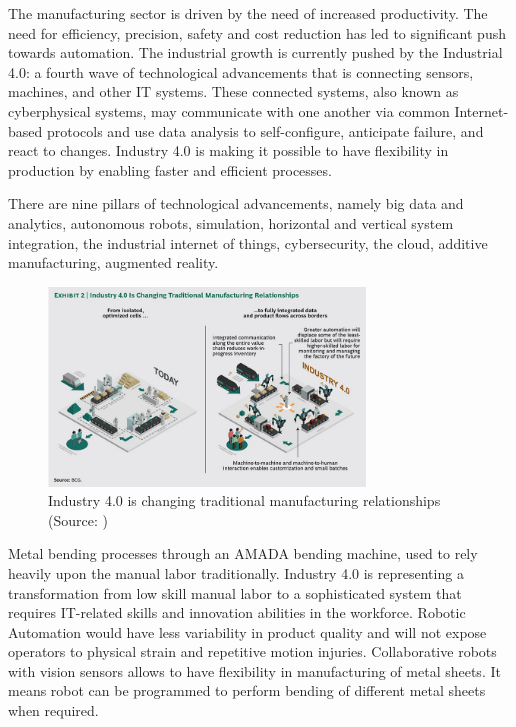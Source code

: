 The manufacturing sector is driven by the need of increased productivity. The need
for efficiency, precision, safety and cost reduction has led to significant push towards
automation. The industrial growth is currently pushed by the Industrial 4.0: a fourth wave
of technological advancements that is connecting sensors, machines, and other
IT systems. These connected systems, also known as cyberphysical systems, may communicate with one 
another via common Internet-based protocols and use data analysis to self-configure, anticipate 
failure, and react to changes. Industry 4.0 is making it possible to have
flexibility in production by enabling faster and efficient processes. 

There are nine pillars of technological advancements, namely big data and analytics, autonomous robots, simulation,
horizontal and vertical system integration, the industrial internet of things,
cybersecurity, the cloud, additive manufacturing, augmented reality. \cite{russmann2015industry}


\begin{figure}[h]
    \centering
    \includegraphics[width=0.75\textwidth]{1. Introduction/1.1 Background/exhibit2.png}
    \caption{Industry 4.0 is changing traditional manufacturing relationships (Source: \cite{russmann2015industry})}
    \label{fig:background-exhibit-2}
\end{figure}

Metal bending processes through an AMADA bending machine, used to rely heavily upon the
manual labor traditionally. Industry 4.0 is representing a transformation
from low skill manual labor to a sophisticated system that requires IT-related skills
and innovation abilities in the workforce. Robotic Automation would have less variability in product
quality and will not expose operators to physical strain and repetitive motion injuries. Collaborative robots
with vision sensors allows to have flexibility in manufacturing of metal sheets.
It means robot can be programmed to perform bending of different metal sheets when required.
